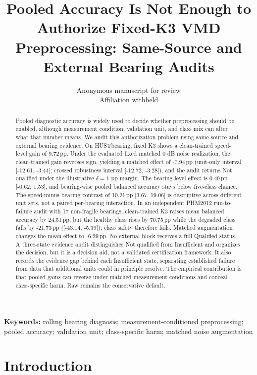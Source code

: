 \documentclass[11pt]{article}
\title{Pooled Accuracy Is Not Enough to Authorize Fixed-K3 VMD Preprocessing: Same-Source and External Bearing Audits}
\author{Anonymous manuscript for review\\
Affiliation withheld}
\date{}
\newcommand{\SI}[2]{#1\,\ensuremath{#2}}
\newcommand{\pp}{\mathrm{pp}}
\begin{document}
\maketitle

\begin{abstract}
\vspace{0.35em}
\noindent
Pooled diagnostic accuracy is widely used to decide whether preprocessing
should be enabled, although measurement condition, validation unit, and class
mix can alter what that number means. We audit this authorization problem using
same-source and external bearing evidence. On HUSTbearing, fixed K3 shows a
clean-trained speed-level gain of \SI{9.72}{\pp}. Under the evaluated fixed
matched 0 dB noise realization, the clean-trained gain reverses sign, yielding
a matched effect of \SI{-7.94}{\pp}
(unit-only interval [-12.61, -3.44]; crossed robustness interval
[-12.72, -3.28]), and the audit returns Not qualified under the illustrative
$\delta=1$ pp margin. The bearing-level effect is \SI{0.49}{\pp}
[-0.62, 1.53], and bearing-wise pooled balanced accuracy stays below five-class
chance. The speed-minus-bearing contrast of \SI{10.21}{\pp}
[3.67, 19.06] is descriptive across different unit sets, not a paired
per-bearing interaction. In an independent PHM2012 run-to-failure audit with 17
non-fragile bearings, clean-trained K3 raises mean balanced accuracy by
\SI{24.51}{\pp}, but the healthy class rises by \SI{70.75}{\pp} while the
degraded class falls by \SI{-21.73}{\pp} ([-43.14, -5.39]); class safety
therefore fails. Matched augmentation changes the mean effect to
\SI{-6.29}{\pp}. No external block receives a full Qualified status. A
three-state evidence audit distinguishes Not qualified from Insufficient and
organizes the decision, but it is a decision aid, not a validated certification
framework. It also records the evidence gap behind each Insufficient state,
separating established failure from data that additional units could in
principle resolve. The empirical contribution is that pooled gains can reverse
under matched measurement conditions and conceal class-specific harm. Raw
remains the conservative default.
\end{abstract}

\noindent\textbf{Keywords:} rolling bearing diagnosis; measurement-conditioned
preprocessing; pooled accuracy; validation unit; class-specific harm;
matched noise augmentation

\section{Introduction}
\end{document}
